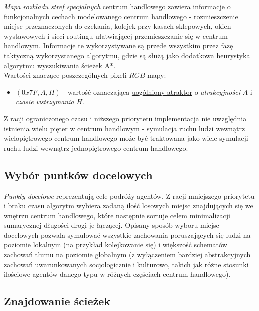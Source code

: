 \documentclass[a4paper, 12pt]{article}
\begin{document}
        \emph{Mapa rozkładu stref specjalnych} centrum handlowego zawiera informacje o funkcjonalnych cechach modelowanego centrum handlowego - rozmieszczenie miejsc przeznaczonych do czekania, kolejek przy kasach sklepowych, okien wystawowych i sieci routingu ułatwiającej przemieszczanie się w centrum handlowym. Informacje te wykorzystywane są przede wszystkim przez \hyperref[sec:tactical]{fazę taktyczną} wykorzystanego algorytmu, gdzie są służą jako \hyperref[sec:path-deviation]{dodatkowa heurystyka} \hyperref[sec:path-finding]{algorytmu wyszukiwania ścieżek A*}. \\

\noindent
Wartości znaczące poszczególnych pixeli $RGB$ mapy:

        \begin{itemize}
            \item $(0x7F, A, H)$ - wartość oznaczająca \hyperref[sec:path-deviation]{uogólniony atraktor} o \emph{atrakcyjności} $A$ i \emph{czasie wstrzymania} $H$.
        \end{itemize}

\noindent
Z racji ograniczonego czasu i niższego priorytetu implementacja nie uwzględnia istnienia wielu pięter w centrum handlowym - symulacja ruchu ludzi wewnątrz wielopiętrowego centrum handlowego może być traktowana jako wiele symulacji ruchu ludzi wewnątrz jednopiętrowego centrum handlowego.

        \subsection{Wybór puntków docelowych}
        \label{sec:destination-choice}

        \emph{Punkty docelowe} reprezentują cele podróży agentów. Z racji mniejszego priorytetu i braku czasu algorytm wybiera zadaną ilość losowych miejsc znajdujących się we wnętrzu centrum handlowego, które następnie sortuje celem minimalizacji sumarycznej długości drogi je łączącej. Opisany sposób wyboru miejsc docelowych pozwala symulować wszystkie zachowania poruszających się ludzi na poziomie lokalnym (na przykład kolejkowanie się) i większość schematów zachowań tłumu na poziomie globalnym (z wyłączeniem bardziej abstrakcyjnych zachowań uwarunkowanych socjologicznie i kulturowo, takich jak różne stosunki ilościowe agentów danego typu w różnych częściach centrum handlowego).

\newpage
        \subsection{Znajdowanie ścieżek}
        \label{sec:path-finding}
\end{document}

